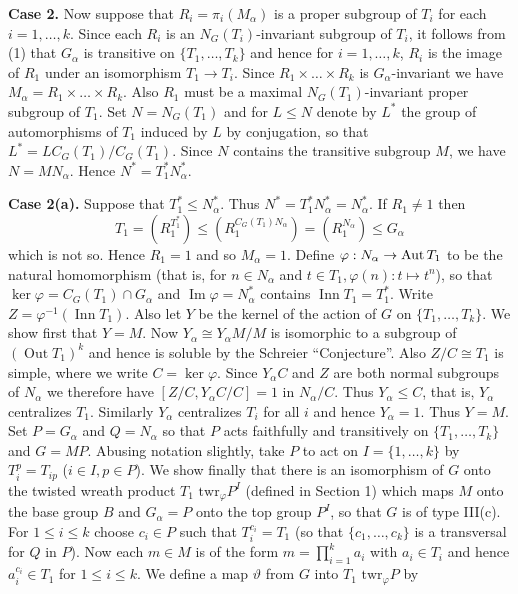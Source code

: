 \textbf{Case 2.} Now suppose that $R_i = \pi_i(M_\alpha)$ is a proper subgroup of $T_i$ for each $i=1, \dots, k$. Since each $R_i$ is an $N_G(T_i)$-invariant subgroup of $T_i$, it follows from (1) that $G_\alpha$ is transitive on $\{T_1, \dots, T_k\}$ and hence for $i=1, \dots, k$, $R_i$ is the image of $R_1$ under an isomorphism $T_1 \to T_i$. Since $R_1 \times \dots \times R_k$ is $G_\alpha$-invariant we have $M_\alpha = R_1 \times \dots \times R_k$. Also $R_1$ must be a maximal $N_G(T_1)$-invariant proper subgroup of $T_1$. Set $N = N_G(T_1)$ and for $L \le N$ denote by $L^*$ the group of automorphisms of $T_1$ induced by $L$ by conjugation, so that $L^* = LC_G(T_1)/C_G(T_1)$. Since $N$ contains the transitive subgroup $M$, we have $N=MN_\alpha$. Hence $N^*=T_1^*N_\alpha^*$.

\textbf{Case 2(a).} Suppose that $T_1^* \le N_\alpha^*$. Thus $N^*=T_1^*N_\alpha^* = N_\alpha^*$. If $R_1 \neq 1$ then
$$T_1 = (R_1^{T_1^*}) \le (R_1^{C_G(T_1)N_\alpha}) = (R_1^{N_\alpha}) \le G_\alpha $$
which is not so. Hence $R_1=1$ and so $M_\alpha=1$. Define $\varphi: N_\alpha \to \operatorname{Aut} T_1$ to be the natural homomorphism (that is, for $n \in N_\alpha$ and $t \in T_1, \varphi(n): t \mapsto t^n$), so that $\ker \varphi = C_G(T_1) \cap G_\alpha$ and $\operatorname{Im} \varphi = N_\alpha^*$ contains $\operatorname{Inn} T_1 = T_1^*$. Write $Z=\varphi^{-1}(\operatorname{Inn} T_1)$. Also let $Y$ be the kernel of the action of $G$ on $\{T_1, \dots, T_k\}$. We show first that $Y=M$. Now $Y_\alpha \cong Y_\alpha M/M$ is isomorphic to a subgroup of $(\operatorname{Out} T_1)^k$ and hence is soluble by the Schreier ``Conjecture''. Also $Z/C \cong T_1$ is simple, where we write $C = \ker \varphi$. Since $Y_\alpha C$ and $Z$ are both normal subgroups of $N_\alpha$ we therefore have $[Z/C, Y_\alpha C/C] = 1$ in $N_\alpha/C$. Thus $Y_\alpha \le C$, that is, $Y_\alpha$ centralizes $T_1$. Similarly $Y_\alpha$ centralizes $T_i$ for all $i$ and hence $Y_\alpha=1$. Thus $Y=M$.
Set $P=G_\alpha$ and $Q=N_\alpha$ so that $P$ acts faithfully and transitively on $\{T_1, \dots, T_k\}$ and $G=MP$. Abusing notation slightly, take $P$ to act on $I=\{1, \dots, k\}$ by $T_i^p = T_{ip}$ ($i \in I, p \in P$). We show finally that there is an isomorphism of $G$ onto the twisted wreath product $T_1 \text{ twr}_\varphi P^I$ (defined in Section 1) which maps $M$ onto the base group $B$ and $G_\alpha=P$ onto the top group $P^I$, so that $G$ is of type III(c). For $1 \le i \le k$ choose $c_i \in P$ such that $T_i^{c_i} = T_1$ (so that $\{c_1, \dots, c_k\}$ is a transversal for $Q$ in $P$). Now each $m \in M$ is of the form $m = \prod_{i=1}^k a_i$ with $a_i \in T_i$ and hence $a_i^{c_i} \in T_1$ for $1 \le i \le k$. We define a map $\vartheta$ from $G$ into $T_1 \text{ twr}_\varphi P$ by
